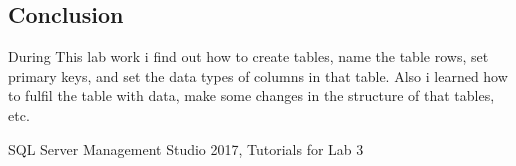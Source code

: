 \documentclass[12pt]{article}
\begin{document}
        \subsection*{Conclusion}
        During This lab work i find out how to create tables, name the table rows, set primary keys, and set the data types of columns in that table. Also i learned how to fulfil the table with data, make some changes in the structure of that tables, etc.
        \cite{SQLServerManagementStudio}
        

 
\medskip
 
\begin{thebibliography}{9}
SQL Server Management Studio 2017, Tutorials for Lab 3

\end{thebibliography}
                
\end{document}
